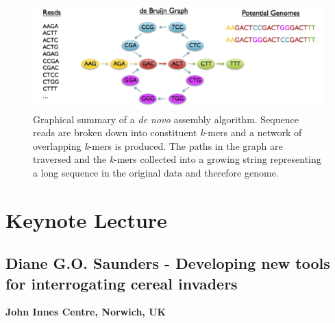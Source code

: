 \documentclass[12pt,]{book}
\theoremstyle{definition}
\theoremstyle{definition}
\theoremstyle{remark}
\begin{document}
\begin{figure}
\includegraphics[width=5.84in]{assets/algo} \caption{Graphical summary of a \emph{de novo} assembly algorithm.
Sequence reads are broken down into constituent \emph{k}-mers and a
network of overlapping \emph{k}-mers is produced. The paths in the graph
are traversed and the \emph{k}-mers collected into a growing string
representing a long sequence in the original data and therefore genome.}\label{fig:mainbio}
\end{figure}

\section*{Keynote Lecture}\label{keynote-lecture-1}

\subsection*{Diane G.O. Saunders - Developing new tools for
interrogating cereal
invaders}\label{diane-g.o.-saunders---developing-new-tools-for-interrogating-cereal-invaders}

\textbf{John Innes Centre, Norwich, UK}
\end{document}
